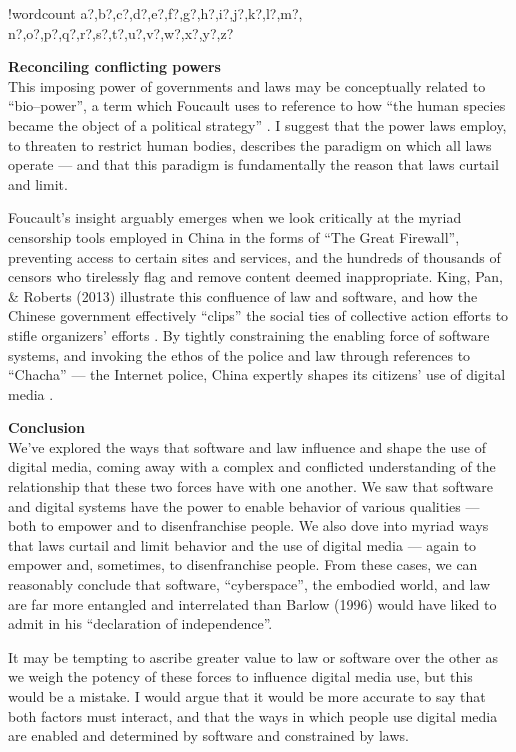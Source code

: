 \documentclass[11pt]{article}
\newcounter{words}
\newenvironment{counted}{%
  \setcounter{words}{0}
  \SearchList!{wordcount}{\stepcounter{words}}
    {a?,b?,c?,d?,e?,f?,g?,h?,i?,j?,k?,l?,m?,
    n?,o?,p?,q?,r?,s?,t?,u?,v?,w?,x?,y?,z?}
  \UndoBoundary{'}
  \SearchOrder{p;}}{%
  \StopSearching}
\newcommand{\sectitle}[1]{\textbf{#1}\\}
\begin{document}
\begin{counted}


\sectitle{Reconciling conflicting powers} %
This imposing power of governments and laws may be conceptually related to ``bio--power'', a term which Foucault uses to reference to how ``the human species became the object of a political strategy''
\cite{foucault2009security}.
I suggest that the power laws employ, to threaten to restrict human bodies, describes the paradigm on which all laws operate
--- and that this paradigm is fundamentally the reason that laws curtail and limit.

Foucault's insight arguably emerges when we look critically at the myriad censorship tools employed in China in the forms of ``The Great Firewall'', preventing access to certain sites and services, and the hundreds of thousands of censors who tirelessly flag and remove content deemed inappropriate.
King, Pan, \& Roberts (2013) illustrate this confluence of law and software, and how the Chinese government effectively ``clips'' the social ties of collective action efforts to stifle organizers' efforts
\cite{king2014reverse}.
By tightly constraining the enabling force of software systems,
and invoking the ethos of the police and law through references to ``Chacha'' --- the Internet police,
China expertly shapes its citizens' use of digital media
\cite{king2013censorship}.


\sectitle{Conclusion}
We've explored the ways that software and law influence and shape the use of digital media,
coming away with a complex and conflicted understanding of the relationship that these two forces have
with one another.
We saw that software and digital systems have the power to enable behavior of various qualities
--- both to empower and to disenfranchise people.
We also dove into myriad ways that laws curtail and limit behavior and the use of digital media
--- again to empower and, sometimes, to disenfranchise people.
From these cases, we can reasonably conclude that software, ``cyberspace'', the embodied world, and law are far more entangled and interrelated than Barlow (1996) would have liked to admit in his ``declaration of independence''.

It may be tempting to ascribe greater value to law or software over the other
as we weigh the potency of these forces to influence digital media use,
but this would be a mistake.
I would argue that it would be more accurate to say that both factors must interact,
and that the ways in which people use digital media are enabled and determined by software and constrained by laws.


\end{counted}
\end{document}
